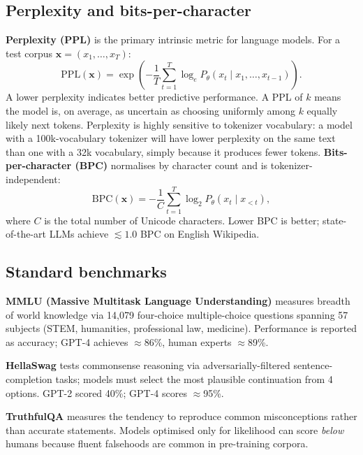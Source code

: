 \documentclass[11pt,a4paper]{article}
\begin{document}
	\subsection{Perplexity and bits-per-character}

	\textbf{Perplexity (PPL)} is the primary intrinsic metric for language models. For a test corpus $\mathbf{x} = (x_1, \ldots, x_T)$:
	\begin{equation}
		\mathrm{PPL}(\mathbf{x}) = \exp\!\left(-\frac{1}{T}\sum_{t=1}^{T} \log_e P_\theta(x_t \mid x_1, \ldots, x_{t-1})\right).
	\end{equation}
	A lower perplexity indicates better predictive performance. A PPL of $k$ means the model is, on average, as uncertain as choosing uniformly among $k$ equally likely next tokens. Perplexity is highly sensitive to tokenizer vocabulary: a model with a 100k-vocabulary tokenizer will have lower perplexity on the same text than one with a 32k vocabulary, simply because it produces fewer tokens. \textbf{Bits-per-character (BPC)} normalises by character count and is tokenizer-independent:
	\begin{equation}
		\mathrm{BPC}(\mathbf{x}) = -\frac{1}{C}\sum_{t=1}^{T} \log_2 P_\theta(x_t \mid x_{<t}),
	\end{equation}
	where $C$ is the total number of Unicode characters. Lower BPC is better; state-of-the-art LLMs achieve $\lesssim 1.0$ BPC on English Wikipedia.

	\subsection{Standard benchmarks}

	\textbf{MMLU (Massive Multitask Language Understanding)} \parencite{hendrycks2021mmlu} measures breadth of world knowledge via 14,079 four-choice multiple-choice questions spanning 57 subjects (STEM, humanities, professional law, medicine). Performance is reported as accuracy; GPT-4 achieves $\approx$86\%, human experts $\approx$89\%.

	\textbf{HellaSwag} \parencite{zellers2019hellaswag} tests commonsense reasoning via adversarially-filtered sentence-completion tasks; models must select the most plausible continuation from 4 options. GPT-2 scored 40\%; GPT-4 scores $\approx$95\%.

	\textbf{TruthfulQA} measures the tendency to reproduce common misconceptions rather than accurate statements. Models optimised only for likelihood can score \emph{below} humans because fluent falsehoods are common in pre-training corpora.
\end{document}
